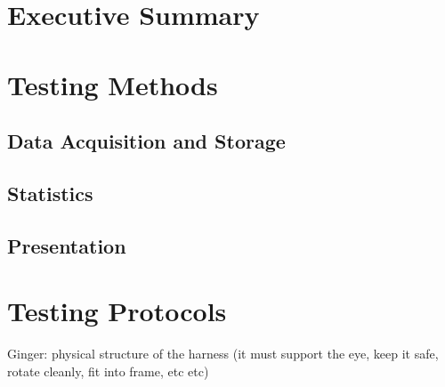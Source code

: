 \documentclass{article}
\begin{document}

\setcounter{tocdepth}{2}
\tableofcontents
\newpage

\listoftables
\listoffigures
\newpage


\section*{Executive Summary}
\label{sec:exec-summary}


\newpage

\section{Testing Methods}
\label{sec:testing-protocols}

\subsection{Data Acquisition and Storage}
\label{sec:data-acqu-stor}

\subsection{Statistics}
\label{sec:statistics}

\subsection{Presentation}
\label{sec:presentation}

\section{Testing Protocols}
\label{sec:protocols}

Ginger: physical structure of the harness (it must support the eye, keep it safe, rotate cleanly, fit into frame, etc etc)
\end{document}
